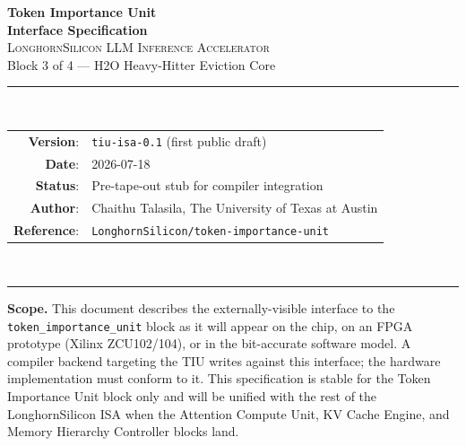 \documentclass[11pt]{article}
\begin{document}
\thispagestyle{empty}
\begin{center}
\vspace*{1.2in}
{\Huge\bfseries Token Importance Unit}\\[0.4em]
{\LARGE\bfseries Interface Specification}\\[1.2em]

{\large \textsc{LonghornSilicon LLM Inference Accelerator}}\\[0.4em]
{\large Block 3 of 4 --- H2O Heavy-Hitter Eviction Core}\\[2em]

\rule{0.7\textwidth}{0.4pt}\\[1em]

\begin{tabular}{rl}
\textbf{Version}:    & \texttt{tiu-isa-0.1} (first public draft) \\
\textbf{Date}:       & 2026-07-18 \\
\textbf{Status}:     & Pre-tape-out stub for compiler integration \\
\textbf{Author}:     & Chaithu Talasila, The University of Texas at Austin \\
\textbf{Reference}:  & \texttt{LonghornSilicon/token-importance-unit} \\
\end{tabular}\\[1em]
\rule{0.7\textwidth}{0.4pt}

\vfill
\begin{minipage}{0.85\textwidth}
\small
\textbf{Scope.} This document describes the externally-visible interface to the
\texttt{token\_importance\_unit} block as it will appear on the chip, on an FPGA
prototype (Xilinx ZCU102/104), or in the bit-accurate software model. A compiler
backend targeting the TIU writes against this interface; the hardware
implementation must conform to it. This specification is stable for the Token
Importance Unit block only and will be unified with the rest of the
LonghornSilicon ISA when the Attention Compute Unit, KV Cache Engine, and Memory
Hierarchy Controller blocks land.
\end{minipage}

\vspace{0.3in}
\end{center}

\clearpage
\tableofcontents
\clearpage
\end{document}
